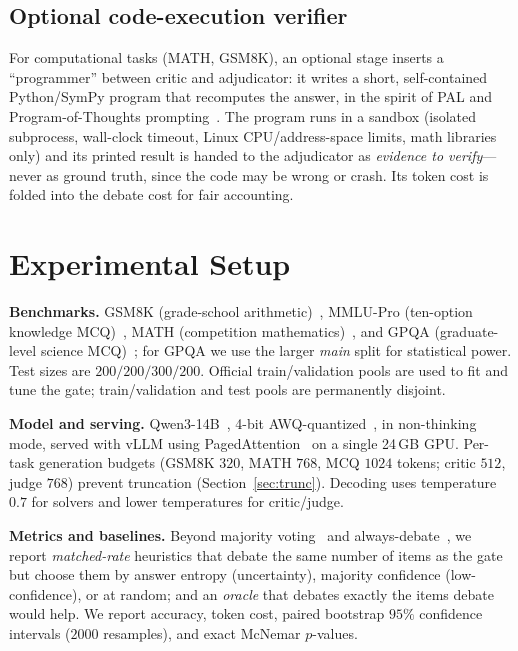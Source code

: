 \documentclass[conference]{IEEEtran}
\begin{document}
\subsection{Optional code-execution verifier}
For computational tasks (MATH, GSM8K), an optional stage inserts a ``programmer''
between critic and adjudicator: it writes a short, self-contained Python/SymPy
program that recomputes the answer, in the spirit of PAL and Program-of-Thoughts
prompting~\cite{gao2023pal,chen2023pot}. The program runs in a sandbox (isolated
subprocess, wall-clock timeout, Linux CPU/address-space limits, math libraries only)
and its printed result is handed to the adjudicator as \emph{evidence to verify}---
never as ground truth, since the code may be wrong or crash. Its token cost is folded
into the debate cost for fair accounting.

\section{Experimental Setup}
\label{sec:setup}
\textbf{Benchmarks.} GSM8K (grade-school arithmetic)~\cite{cobbe2021gsm8k}, MMLU-Pro
(ten-option knowledge MCQ)~\cite{wang2024mmlupro}, MATH (competition
mathematics)~\cite{hendrycks2021math}, and GPQA (graduate-level science
MCQ)~\cite{rein2023gpqa}; for GPQA we use the larger \emph{main} split for
statistical power. Test sizes are $200/200/300/200$. Official train/validation pools
are used to fit and tune the gate; train/validation and test pools are permanently
disjoint.

\textbf{Model and serving.} Qwen3-14B~\cite{qwen2025qwen3}, 4-bit
AWQ-quantized~\cite{lin2024awq}, in non-thinking mode, served with vLLM using
PagedAttention~\cite{kwon2023vllm} on a single 24\,GB GPU. Per-task generation budgets
(GSM8K $320$, MATH $768$, MCQ $1024$ tokens; critic $512$, judge $768$) prevent
truncation (Section~\ref{sec:trunc}). Decoding uses temperature $0.7$ for solvers and
lower temperatures for critic/judge.

\textbf{Metrics and baselines.} Beyond majority voting~\cite{wang2023selfcons} and
always-debate~\cite{du2024debate}, we report \emph{matched-rate} heuristics that
debate the same number of items as the gate but choose them by answer entropy
(uncertainty), majority confidence (low-confidence), or at random; and an
\emph{oracle} that debates exactly the items debate would help. We report accuracy,
token cost, paired bootstrap $95\%$ confidence intervals ($2000$ resamples), and exact
McNemar $p$-values.
\end{document}
